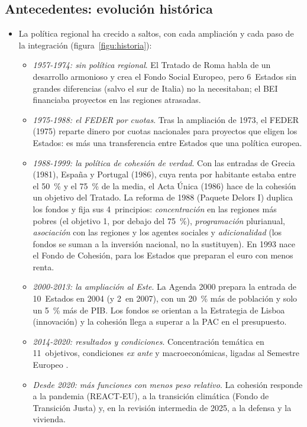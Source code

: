 \documentclass[11pt]{article}
\begin{document}
\subsection{Antecedentes: evolución histórica}\label{sec:historia}

\begin{itemize}
\item La política regional ha crecido a saltos, con cada ampliación y cada paso de la integración (figura~\ref{figu:historia}):
  \begin{itemize}
  \item \emph{1957-1974: sin política regional}. El Tratado de Roma habla de un desarrollo armonioso y crea el Fondo Social Europeo, pero 6~Estados sin grandes diferencias (salvo el sur de Italia) no la necesitaban; el BEI financiaba proyectos en las regiones atrasadas.
  \item \emph{1975-1988: el FEDER por cuotas}. Tras la ampliación de 1973, el FEDER (1975) reparte dinero por cuotas nacionales para proyectos que eligen los Estados: es más una transferencia entre Estados que una política europea.
  \item \emph{1988-1999: la política de cohesión de verdad}. Con las entradas de Grecia (1981), España y Portugal (1986), cuya renta por habitante estaba entre el 50~\% y el 75~\% de la media, el Acta Única (1986) hace de la cohesión un objetivo del Tratado. La reforma de 1988 (Paquete Delors I) duplica los fondos y fija sus 4~principios: \emph{concentración} en las regiones más pobres (el objetivo 1, por debajo del 75~\%), \emph{programación} plurianual, \emph{asociación} con las regiones y los agentes sociales y \emph{adicionalidad} (los fondos se suman a la inversión nacional, no la sustituyen). En 1993 nace el Fondo de Cohesión, para los Estados que preparan el euro con menos renta.
  \item \emph{2000-2013: la ampliación al Este}. La Agenda 2000 prepara la entrada de 10~Estados en 2004 (y 2~en 2007), con un 20~\% más de población y solo un 5~\% más de PIB. Los fondos se orientan a la Estrategia de Lisboa (innovación) y la cohesión llega a superar a la PAC en el presupuesto\nocite{CE2018Panorama64}.
  \item \emph{2014-2020: resultados y condiciones}. Concentración temática en 11~objetivos, condiciones \emph{ex ante} y macroeconómicas, ligadas al Semestre Europeo\nocite{PE2026FichaCohesion} .
  \item \emph{Desde 2020: más funciones con menos peso relativo}. La cohesión responde a la pandemia (REACT-EU), a la transición climática (Fondo de Transición Justa) y, en la revisión intermedia de 2025, a la defensa y la vivienda\nocite{UE2025RevisionIntermedia}.
  \end{itemize}
\end{itemize}
\end{document}

